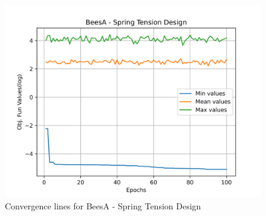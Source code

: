 \begin{figure}[H]
\centering
\caption{Convergence lines for BeesA - Spring Tension Design}
\label{fig:spring_problem_solve_beesa}
\includegraphics[scale=0.5]{images/spring_problem_solve_beesa.png}
\end{figure}
        